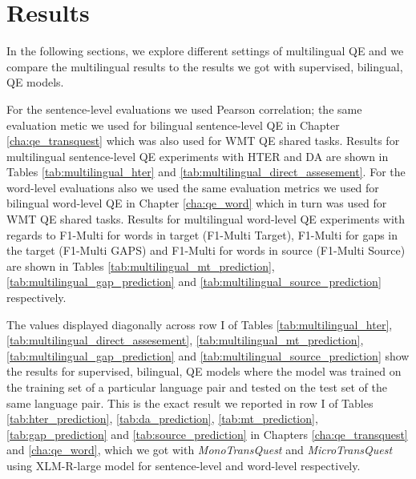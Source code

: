 \section{Results}
\label{sec:multilingual_results}
In the following sections, we explore different settings of multilingual QE and we compare the multilingual results to the results we got with supervised, bilingual, QE models. 

For the sentence-level evaluations we used Pearson correlation; the same evaluation metic we used for bilingual sentence-level QE in Chapter \ref{cha:qe_transquest} which was also used for WMT QE shared tasks. Results for multilingual sentence-level QE experiments with HTER and DA are shown in Tables \ref{tab:multilingual_hter} and \ref{tab:multilingual_direct_assesement}. For the word-level evaluations also we used the same evaluation metrics we used for bilingual word-level QE in Chapter \ref{cha:qe_word} which in turn was used for WMT QE shared tasks. Results for multilingual word-level QE experiments with regards to F1-Multi for words in target (F1-Multi Target), F1-Multi for gaps in the target (F1-Multi GAPS) and F1-Multi for words in source (F1-Multi Source) are shown in Tables \ref{tab:multilingual_mt_prediction}, \ref{tab:multilingual_gap_prediction} and \ref{tab:multilingual_source_prediction} respectively. 

The values displayed diagonally across row I of Tables  \ref{tab:multilingual_hter}, \ref{tab:multilingual_direct_assesement}, \ref{tab:multilingual_mt_prediction}, \ref{tab:multilingual_gap_prediction} and \ref{tab:multilingual_source_prediction} show the results for supervised, bilingual, QE models where the model was trained on the training set of a particular language pair and tested on the test set of the same language pair. This is the exact result we reported in row I of Tables \ref{tab:hter_prediction}, \ref{tab:da_prediction}, \ref{tab:mt_prediction}, \ref{tab:gap_prediction} and \ref{tab:source_prediction} in Chapters \ref{cha:qe_transquest} and \ref{cha:qe_word}, which we got with \textit{MonoTransQuest} and \textit{MicroTransQuest} using  XLM-R-large model \cite{conneau-etal-2020-unsupervised} for sentence-level and word-level respectively. 

